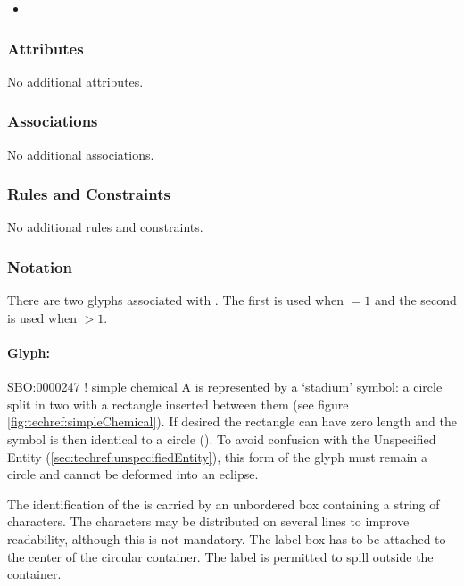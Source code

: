 \begin{itemize}
\item {}
\end{itemize}

\subsubsection{Attributes}

No additional attributes.

\subsubsection{Associations}

No additional associations.

\subsubsection{Rules and Constraints}

No additional rules and constraints.

\subsubsection{Notation}

There are two glyphs associated with . The
first  is used when  $= 1$
and the second  is used when
 $> 1$.

\paragraph{Glyph: }

\begin{glyphDescription}
  \glyphSboTerm SBO:0000247 ! simple chemical \glyphContainer A
   is represented by a `stadium' symbol: a
  circle split in two with a rectangle inserted between them (see
  figure \ref{fig:techref:simpleChemical}). If desired the rectangle can have
  zero length and the symbol is then identical to a circle
  (). To avoid confusion with the Unspecified
  Entity (\ref{sec:techref:unspecifiedEntity}), this form of the glyph must remain a
  circle and cannot be deformed into an eclipse.

  \glyphLabel The identification of the  is
  carried by an unbordered box containing a string of characters.  The
  characters may be distributed on several lines to improve
  readability, although this is not mandatory.  The label box has to
  be attached to the center of the circular container.  The label is
  permitted to spill outside the container.
\end{glyphDescription}


